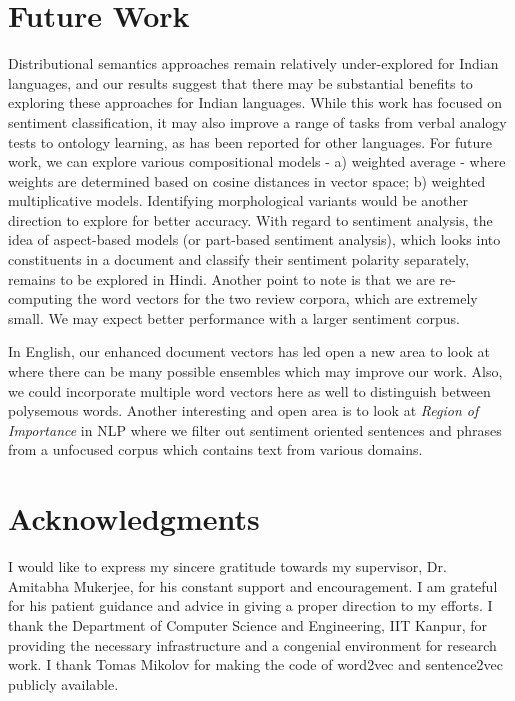 \documentclass[11pt,a4paper]{article}
\begin{document}
\section{Future Work}
\label{sec:future_work}
Distributional semantics approaches remain relatively under-explored for Indian languages, and our results suggest that there may be substantial benefits to exploring these approaches for Indian languages.  While this work has focused on sentiment classification, it may also improve a range of tasks from verbal analogy tests to ontology learning, as has been reported for other languages.
For future work, we can explore various compositional models - a) weighted average - where weights are determined based on cosine distances in vector space;  b) weighted multiplicative models. Identifying morphological variants would be another direction to explore for better accuracy. With regard to sentiment analysis, the idea of aspect-based models (or part-based sentiment analysis), which looks into constituents in a document and classify their sentiment polarity separately, remains to be explored in Hindi. Another point to note is that we are re-computing the word vectors for the two review corpora, which are extremely small.  We may expect better performance  with a larger sentiment corpus.

In English, our enhanced document vectors has led open a new area to look at where there can be many possible ensembles which may improve our work. Also, we could incorporate multiple word vectors here as well to distinguish between polysemous words. Another interesting and open area is to look at \emph{Region of Importance} in NLP where we filter out sentiment oriented sentences and phrases from a unfocused corpus which contains text from various domains.

\section*{Acknowledgments}
I would like to express my sincere gratitude towards my supervisor, Dr. Amitabha Mukerjee, for his  constant support and encouragement. I am grateful for his patient guidance and advice in giving a proper direction to my efforts. I thank the Department of Computer Science and Engineering, IIT Kanpur, for providing the necessary infrastructure and a congenial environment for research work. I thank Tomas Mikolov for making the code of word2vec and sentence2vec publicly available.



\end{document}
